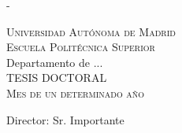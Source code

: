 \begin{titlingpage}
\begin{SingleSpace}
\begin{adjustwidth*}{\unitlength}{-\unitlength}
\begin{center}
{
\vspace{2em}
\textsc{\HUGE Universidad Autónoma de Madrid}\\
\vspace{1.5em}
\textsc{\Large Escuela Politécnica Superior}\\
\vspace{1em}
\large Departamento de ...\\
\vspace{1em}
TESIS DOCTORAL\\
\vspace{2.5em}
\large\textsc{Mes de un determinado año}
}
\vspace{3.5em}
\end{center}
\begin{flushright}
{Director: Sr. Importante}
\end{flushright}
\end{adjustwidth*}
\end{SingleSpace}
\end{titlingpage}

\restoregeometry
